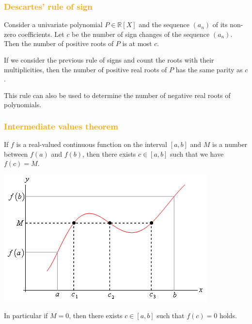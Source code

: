 \begin{frame}[fragile]
\frametitle{\textbf{\textcolor{orange}{Descartes' rule of sign}}}

\begin{drs}[DRS]
Consider a univariate polynomial $P\in\mathbb{R}[X]$ and the sequence 
$(a_n)$ of its non-zero coefficients. Let $c$ be the number of sign changes 
of the sequence $(a_n)$. Then the number of positive roots of $P$ is at most $c$.
\end{drs}

\begin{gp}
If we consider the previous rule of signs and 
count the roots with their multiplicities, 
then the number of positive real roots of $P$ 
has the same parity as $c$.
\end{gp}

This rule can also be used to determine the number of negative real roots of polynomials.

\end{frame}

\begin{frame}[fragile]
\frametitle{\textbf{\textcolor{orange}{Intermediate values theorem}}}

\begin{ivt}[IVT]
If $f$ is a real-valued continuous function on the interval $[a, b]$ and $M$ is a number between $f(a)$ and $f(b)$, then there exists $c\in [a, b]$ such that we have $f(c) = M$.
\end{ivt}

\begin{center}
\includegraphics[scale=0.25]{TIV.png}
\end{center}

In particular if $M = 0$, then there exists $c\in [a, b]$ such that $f(c) = 0$ holds.

\end{frame}

